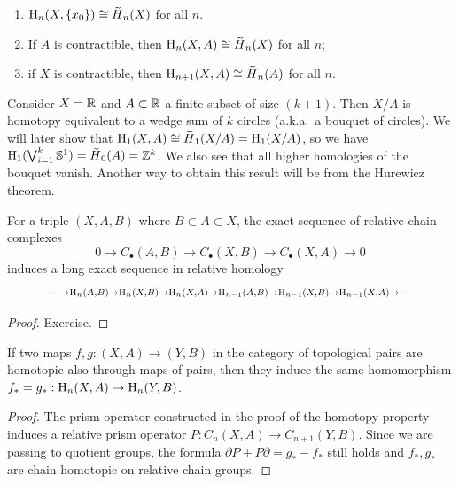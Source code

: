 \begin{cor}
    \begin{enumerate}
        \item $\rmH_n(X,
        \{x_0\})\cong\wt{H}_n(X)$ for all $n$.
        \item If $A$ is contractible, then $\rmH_n(X,A)\cong \wt{H}_n(X)$ for all $n$;
        \item if $X$ is contractible, then $\rmH_{n+1}(X,A)\cong \wt{H}_n(A)$ for all $n$.
    \end{enumerate}
\end{cor}

\begin{example}
    Consider $X=\mathbb{R}$ and $A\subset \mathbb{R}$ a finite subset of size $(k+1)$. Then $X/A$ is homotopy equivalent to a wedge sum of $k$ circles (a.k.a.\ a bouquet of circles). We will later show that $\rmH_1(X,A)\cong \wt{H}_1(X/A)= \rmH_1(X/A)$, so we have $\rmH_1(\bigvee_{i=1}^{k}\bbS^1)=\wt{H}_0(A)=\bbZ^{k}$. We also see that all higher homologies of the bouquet vanish. Another way to obtain this result will be from the Hurewicz theorem.
\end{example}



\begin{prop}\label{exact sequence of a triple}
    For a triple $(X,A,B)$ where $B\subset A\subset X$, the exact sequence of relative chain complexes
    \[0\to C_\bullet(A,B)\to C_\bullet (X,B)\to C_\bullet(X,A)\to 0 \]
    induces a long exact sequence in relative homology
    \[\scriptstyle
    \cdots \to \mathrm{H}_n(A,B)\to \mathrm{H}_n(X,B)\to \mathrm{H}_n(X,A)\to \mathrm{H}_{n-1}(A,B)\to \mathrm{H}_{n-1}(X,B)\to \mathrm{H}_{n-1}(X,A)\to \cdots
    \]
\end{prop}
\begin{proof}
     Exercise.
\end{proof}


\begin{prop}
    If two maps $f,g:(X,A)\to (Y,B)$ in the category of topological pairs are homotopic also through maps of pairs, then they induce the same homomorphism $f_\ast=g_\ast:\mathrm{H}_n(X,A)\to \mathrm{H}_n(Y,B)$.
\end{prop}
\begin{proof}
     The prism operator constructed in the proof of the homotopy property induces a relative prism operator $P:C_n(X,A)\to C_{n+1}(Y,B)$. Since we are passing to quotient groups, the formula $\partial P+P\partial=g_\ast-f_\ast$ still holds and $f_\ast,g_\ast$ are chain homotopic on relative chain groups. 
\end{proof}


